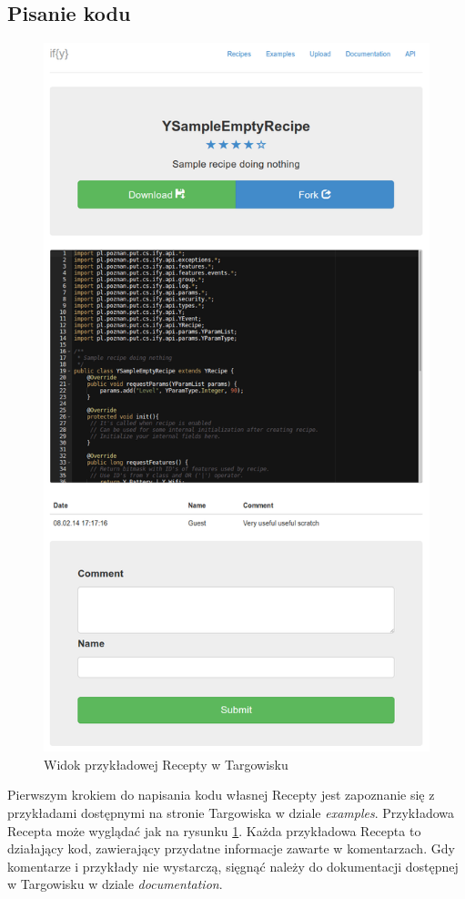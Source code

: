 \documentclass[11pt,a4paper,polish,thesis]{dcsbook}
\begin{document}
\subsection{Pisanie kodu}
\begin{figure}[H]
  \centering
  \includegraphics[scale=0.4]{./resources/market_recipe.png}
  \caption{Widok przykładowej Recepty w Targowisku}
  \label{fig:market_recipe}
\end{figure}
Pierwszym krokiem do napisania kodu własnej Recepty jest zapoznanie się z przykładami dostępnymi na stronie Targowiska w dziale \emph{examples}. Przykładowa Recepta
może wyglądać jak na rysunku \ref{fig:market_recipe}. Każda przykładowa Recepta to działający kod, zawierający przydatne informacje zawarte w komentarzach. Gdy komentarze i przykłady nie wystarczą, sięgnąć należy do dokumentacji dostępnej w Targowisku w dziale \emph{documentation}.
\end{document}
